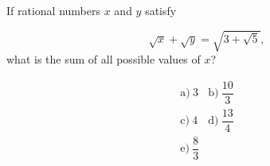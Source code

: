 If rational numbers \(x\) and \(y\) satisfy

\[
\sqrt{x}+\sqrt{y}=\sqrt{3+\sqrt{5}},
\]what is the sum of all possible values of \(x\)?



\[
\begin{array}{ll}
\text{a)}\ 3 & \text{b)}\ \dfrac{10}{3} \\
\text{c)}\ 4 & \text{d)}\ \dfrac{13}{4} \\
\text{e)}\ \dfrac{8}{3}
\end{array}
\]
